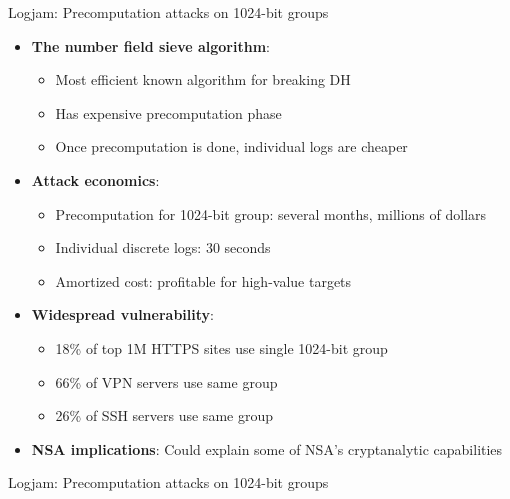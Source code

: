 \documentclass[aspectratio=169, lualatex, handout]{beamer}
\begin{document}
\begin{frame}{Logjam: Precomputation attacks on 1024-bit groups}
	\begin{itemize}
		\item \textbf{The number field sieve algorithm}:
		      \begin{itemize}
			      \item Most efficient known algorithm for breaking DH
			      \item Has expensive precomputation phase
			      \item Once precomputation is done, individual logs are cheaper
		      \end{itemize}
		\item \textbf{Attack economics}:
		      \begin{itemize}
			      \item Precomputation for 1024-bit group: several months, millions of dollars
			      \item Individual discrete logs: 30 seconds
			      \item Amortized cost: profitable for high-value targets
		      \end{itemize}
		\item \textbf{Widespread vulnerability}:
		      \begin{itemize}
			      \item 18\% of top 1M HTTPS sites use single 1024-bit group
			      \item 66\% of VPN servers use same group
			      \item 26\% of SSH servers use same group
		      \end{itemize}
		\item \textbf{NSA implications}: Could explain some of NSA's cryptanalytic capabilities
	\end{itemize}
\end{frame}

\begin{frame}{Logjam: Precomputation attacks on 1024-bit groups}
\end{frame}
\end{document}
